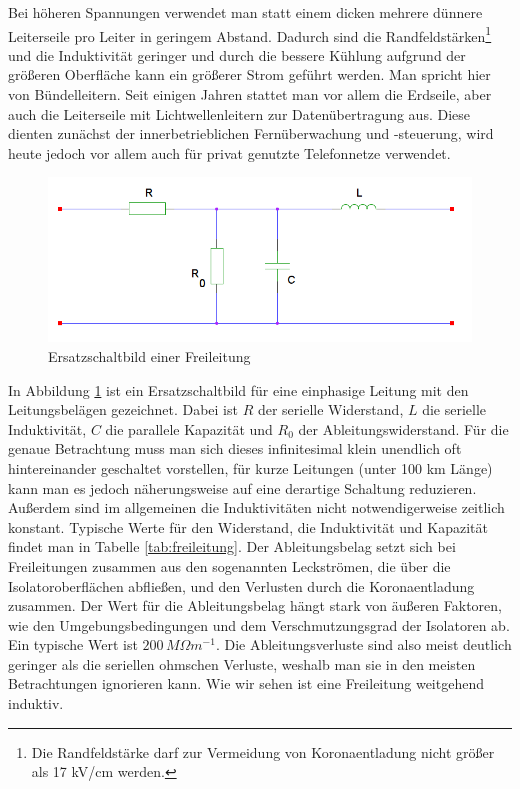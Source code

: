 Bei höheren Spannungen verwendet man statt einem dicken mehrere dünnere Leiterseile pro Leiter in geringem Abstand. Dadurch sind die Randfeldstärken\footnote{Die Randfeldstärke darf zur Vermeidung von Koronaentladung nicht größer als 17 kV/cm werden.\cite{Flosdorff}} und die Induktivität geringer und durch die bessere Kühlung aufgrund der größeren Oberfläche kann ein größerer Strom geführt werden. Man spricht hier von Bündelleitern.
Seit einigen Jahren stattet man vor allem die Erdseile, aber auch die Leiterseile mit Lichtwellenleitern zur Datenübertragung aus. Diese dienten zunächst der innerbetrieblichen Fernüberwachung und -steuerung, wird heute jedoch vor allem auch für privat genutzte Telefonnetze verwendet.\cite{Flosdorff}

\begin{figure}[tbhn]
\begin{center}
\noindent
\includegraphics[scale=0.5]{freileitung.png}
\end{center}
\caption{Ersatzschaltbild einer Freileitung} %
\label{pic:Ersatzschaltbildfreileitung}
\end{figure}

In Abbildung \ref{pic:Ersatzschaltbildfreileitung} ist ein Ersatzschaltbild für eine einphasige Leitung mit den Leitungsbelägen gezeichnet.
Dabei ist $R$ der serielle Widerstand, $L$ die serielle Induktivität, $C$ die parallele Kapazität und $R_0$ der Ableitungswiderstand. Für die genaue Betrachtung muss man sich dieses infinitesimal klein unendlich oft hintereinander geschaltet vorstellen, für kurze Leitungen (unter 100 km Länge) kann man es jedoch näherungsweise auf eine derartige Schaltung reduzieren\cite{Harrison}.
Außerdem sind im allgemeinen die Induktivitäten nicht notwendigerweise zeitlich konstant\cite{Flosdorff}.
Typische Werte für den Widerstand, die Induktivität und Kapazität findet man in Tabelle \ref{tab:freileitung}.
Der Ableitungsbelag setzt sich bei Freileitungen zusammen aus den sogenannten Leckströmen, die über die Isolatoroberflächen abfließen, und den Verlusten durch die Koronaentladung zusammen.\cite{Heuck}
Der Wert für die Ableitungsbelag hängt stark von äußeren Faktoren, wie den Umgebungsbedingungen und dem Verschmutzungsgrad der Isolatoren ab. Ein typische Wert ist $200\,M\Omega m^{-1}$.\cite{Harrison} Die Ableitungsverluste sind also meist deutlich geringer als die seriellen ohmschen Verluste, weshalb man sie in den meisten Betrachtungen ignorieren kann.
Wie wir sehen ist eine Freileitung weitgehend induktiv. %

